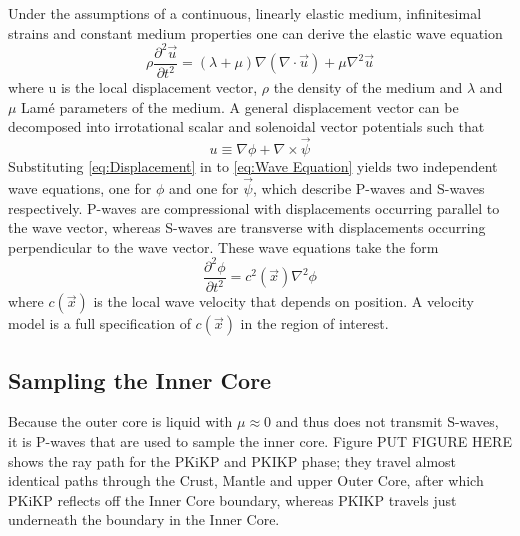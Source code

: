 \documentclass[11pt,a4paper]{article}
\begin{document}
Under the assumptions of a continuous, linearly elastic medium, infinitesimal strains and constant medium properties one can derive the elastic wave equation
\begin{equation}
	\rho \frac{\partial^{2} \vec{u}}{\partial t^{2}} = \left ( \lambda + \mu \right ) \nabla \left ( \nabla \cdot \vec{u} \right ) + \mu \nabla^{2} \vec{u}
	\label{eq:Wave Equation}
\end{equation}
where u is the local displacement vector, $\rho$ the density of the medium and $\lambda$ and $\mu$  Lam\'{e} parameters of the medium. A general displacement vector can be decomposed into irrotational scalar and solenoidal vector potentials such that
\begin{equation}
	u \equiv \nabla \phi + \nabla \times \vec{\psi}
	\label{eq:Displacement}
\end{equation}
Substituting \eqref{eq:Displacement} in to \eqref{eq:Wave Equation} yields two independent wave equations, one for $\phi$ and one for $\vec{\psi}$, which describe P-waves and S-waves respectively. P-waves are compressional with displacements occurring parallel to the wave vector, whereas S-waves are transverse with displacements occurring perpendicular to the wave vector. These wave equations take the form
\begin{equation}
	\frac{\partial^{2} \phi}{\partial t^{2}} = c^{2} \left ( \vec{x} \right ) \nabla^{2} \phi
\end{equation}
where $c(\vec{x})$ is the local wave velocity that depends on position. A velocity model is a full specification of $c(\vec{x})$ in the region of interest.

\subsection{Sampling the Inner Core}
\label{sec:Sampling}
Because the outer core is liquid with $\mu \approx 0$ and thus does not transmit S-waves, it is P-waves that are used to sample the inner core. Figure PUT FIGURE HERE shows the ray path for the PKiKP and PKIKP phase; they travel almost identical paths through the Crust, Mantle and upper Outer Core, after which PKiKP reflects off the Inner Core boundary, whereas PKIKP travels just underneath the boundary in the Inner Core.
\end{document}
